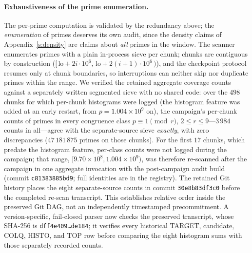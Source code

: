 \paragraph{Exhaustiveness of the prime enumeration.}
The per-prime computation is validated by the redundancy above; the
\emph{enumeration} of primes deserves its own audit, since the density claims of
Appendix~\ref{s:density} are claims about \emph{all} primes in the window. The
scanner enumerates primes with a plain in-process sieve per chunk; chunks are
contiguous by construction ($[\,\mathrm{lo}+2i\cdot10^{6}$,
$\mathrm{lo}+2(i{+}1)\cdot10^{6}\,)$), and the checkpoint protocol resumes only
at chunk boundaries, so interruptions can neither skip nor duplicate primes
within the range. We verified the retained aggregate coverage counts against a
separately written segmented sieve with no shared code:
over the $498$ chunks for which per-chunk histograms were logged (the histogram
feature was added at an early restart, from $p=1.004\times10^{9}$ on), the
campaign's per-chunk counts of primes in every congruence class $p\equiv1\pmod
r$, $2\le r\le9$---$3\,984$ counts in all---agree with the separate-source sieve
\emph{exactly}, with zero discrepancies ($47\,181\,875$ primes on those
chunks). For the first $17$ chunks, which predate the histogram feature,
per-class counts were not logged during the campaign; that range,
$[9.70\times10^{8},1.004\times10^{9})$, was therefore re-scanned after the
campaign in one aggregate invocation with the post-campaign audit build
(commit \texttt{c81383885bd9}; full identities are in the registry).  The
retained Git history places the eight separate-source counts in commit
\texttt{30e8b83df3c0} before the completed re-scan transcript.  This establishes
relative order inside the preserved Git DAG, not an independently timestamped
precommitment.  A version-specific,
fail-closed parser now checks the preserved transcript, whose SHA-256 is
\texttt{dff4e409\ldots de184};
it verifies every historical TARGET, candidate, COLQ, HISTO, and TOP row before
comparing the eight histogram sums with those separately recorded counts.



